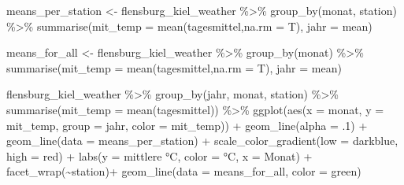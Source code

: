 \documentclass[
]{book}
\newenvironment{Shaded}{\begin{snugshade}}{\end{snugshade}}
\newcommand{\AttributeTok}[1]{\textcolor[rgb]{0.77,0.63,0.00}{#1}}
\newcommand{\DecValTok}[1]{\textcolor[rgb]{0.00,0.00,0.81}{#1}}
\newcommand{\FunctionTok}[1]{\textcolor[rgb]{0.00,0.00,0.00}{#1}}
\newcommand{\NormalTok}[1]{#1}
\newcommand{\OtherTok}[1]{\textcolor[rgb]{0.56,0.35,0.01}{#1}}
\newcommand{\SpecialCharTok}[1]{\textcolor[rgb]{0.00,0.00,0.00}{#1}}
\newcommand{\StringTok}[1]{\textcolor[rgb]{0.31,0.60,0.02}{#1}}
\begin{document}
\begin{Shaded}
\begin{Highlighting}[]
\NormalTok{means\_per\_station }\OtherTok{\textless{}{-}}\NormalTok{ flensburg\_kiel\_weather }\SpecialCharTok{\%\textgreater{}\%} 
  \FunctionTok{group\_by}\NormalTok{(monat, station) }\SpecialCharTok{\%\textgreater{}\%} 
  \FunctionTok{summarise}\NormalTok{(}\AttributeTok{mit\_temp =} \FunctionTok{mean}\NormalTok{(tagesmittel,}\AttributeTok{na.rm =}\NormalTok{ T),}
            \AttributeTok{jahr =} \StringTok{\textquotesingle{}mean\textquotesingle{}}\NormalTok{)}

\NormalTok{means\_for\_all }\OtherTok{\textless{}{-}}\NormalTok{ flensburg\_kiel\_weather }\SpecialCharTok{\%\textgreater{}\%} 
  \FunctionTok{group\_by}\NormalTok{(monat) }\SpecialCharTok{\%\textgreater{}\%} 
  \FunctionTok{summarise}\NormalTok{(}\AttributeTok{mit\_temp =} \FunctionTok{mean}\NormalTok{(tagesmittel,}\AttributeTok{na.rm =}\NormalTok{ T),}
            \AttributeTok{jahr =} \StringTok{\textquotesingle{}mean\textquotesingle{}}\NormalTok{)}


\NormalTok{flensburg\_kiel\_weather }\SpecialCharTok{\%\textgreater{}\%} 
  \FunctionTok{group\_by}\NormalTok{(jahr, monat, station) }\SpecialCharTok{\%\textgreater{}\%} 
  \FunctionTok{summarise}\NormalTok{(}\AttributeTok{mit\_temp =} \FunctionTok{mean}\NormalTok{(tagesmittel)) }\SpecialCharTok{\%\textgreater{}\%} 
  \FunctionTok{ggplot}\NormalTok{(}\FunctionTok{aes}\NormalTok{(}\AttributeTok{x =}\NormalTok{ monat, }
             \AttributeTok{y =}\NormalTok{ mit\_temp,}
             \AttributeTok{group =}\NormalTok{ jahr,}
             \AttributeTok{color =}\NormalTok{ mit\_temp)) }\SpecialCharTok{+}
  \FunctionTok{geom\_line}\NormalTok{(}\AttributeTok{alpha =}\NormalTok{ .}\DecValTok{1}\NormalTok{) }\SpecialCharTok{+}
  \FunctionTok{geom\_line}\NormalTok{(}\AttributeTok{data =}\NormalTok{ means\_per\_station) }\SpecialCharTok{+}
  \FunctionTok{scale\_color\_gradient}\NormalTok{(}\AttributeTok{low =} \StringTok{\textquotesingle{}darkblue\textquotesingle{}}\NormalTok{,}
                       \AttributeTok{high =} \StringTok{\textquotesingle{}red\textquotesingle{}}\NormalTok{) }\SpecialCharTok{+}
  \FunctionTok{labs}\NormalTok{(}\AttributeTok{y =} \StringTok{\textquotesingle{}mittlere °C\textquotesingle{}}\NormalTok{,}
       \AttributeTok{color =} \StringTok{\textquotesingle{}°C\textquotesingle{}}\NormalTok{,}
       \AttributeTok{x =} \StringTok{\textquotesingle{}Monat\textquotesingle{}}\NormalTok{) }\SpecialCharTok{+}
  \FunctionTok{facet\_wrap}\NormalTok{(}\SpecialCharTok{\textasciitilde{}}\NormalTok{station)}\SpecialCharTok{+}
  \FunctionTok{geom\_line}\NormalTok{(}\AttributeTok{data =}\NormalTok{ means\_for\_all,}
            \AttributeTok{color =} \StringTok{\textquotesingle{}green\textquotesingle{}}\NormalTok{)}
\end{Highlighting}
\end{Shaded}
\end{document}

